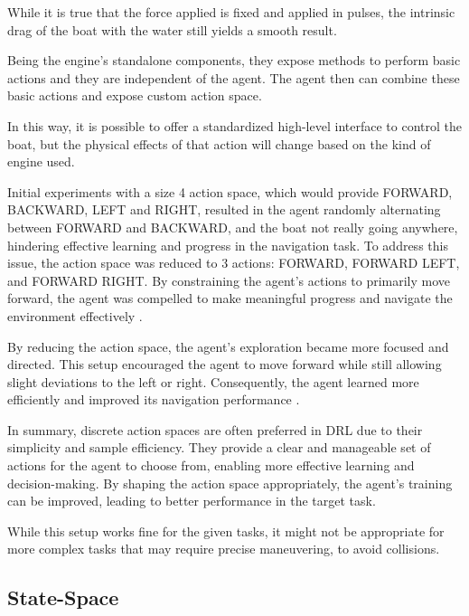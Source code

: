 \begin{textblock}
While it is true that the force applied is fixed and applied in pulses, the intrinsic drag of the boat with the water still yields a smooth result. 

Being the engine's standalone components, they expose methods to perform basic actions and they are independent of the agent. The agent then can combine these basic actions and expose custom action space.

In this way, it is possible to offer a standardized high-level interface to control the boat, but the physical effects of that action will change based on the kind of engine used.

Initial experiments with a size 4 action space, which would provide FORWARD, BACKWARD, LEFT and RIGHT, resulted in the agent randomly alternating between FORWARD and BACKWARD, and the boat not really going anywhere, hindering effective learning and progress in the navigation task. 
To address this issue, the action space was reduced to 3 actions: FORWARD, FORWARD LEFT, and FORWARD RIGHT. By constraining the agent's actions to primarily move forward, the agent was compelled to make meaningful progress and navigate the environment effectively \cite{kanervisto2020}.

By reducing the action space, the agent's exploration became more focused and directed. This setup encouraged the agent to move forward while still allowing slight deviations to the left or right. Consequently, the agent learned more efficiently and improved its navigation performance \cite{kanervisto2020}.

In summary, discrete action spaces are often preferred in DRL due to their simplicity and sample efficiency. They provide a clear and manageable set of actions for the agent to choose from, enabling more effective learning and decision-making. By shaping the action space appropriately, the agent's training can be improved, leading to better performance in the target task.

While this setup works fine for the given tasks, it might not be appropriate for more complex tasks that may require precise maneuvering, to avoid collisions.
\end{textblock}




\subsection{State-Space}

